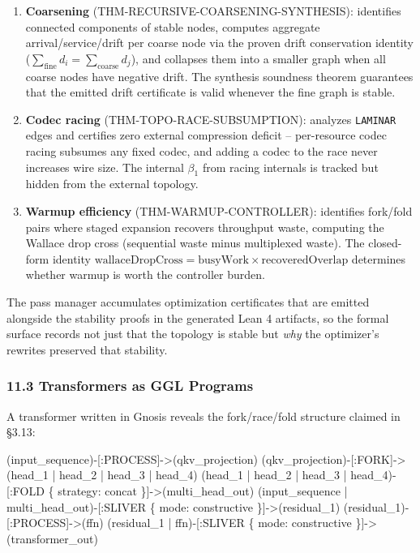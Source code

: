 \documentclass[
  11pt,
]{article}
\newenvironment{Shaded}{}{}
\newcommand{\NormalTok}[1]{#1}
\begin{document}
\begin{enumerate}
\def\labelenumi{\arabic{enumi}.}
\item
  \textbf{Coarsening} (THM-RECURSIVE-COARSENING-SYNTHESIS): identifies
  connected components of stable nodes, computes aggregate
  arrival/service/drift per coarse node via the proven drift
  conservation identity
  (\(\sum_{\text{fine}} d_i = \sum_{\text{coarse}} d_j\)), and collapses
  them into a smaller graph when all coarse nodes have negative drift.
  The synthesis soundness theorem guarantees that the emitted drift
  certificate is valid whenever the fine graph is stable.
\item
  \textbf{Codec racing} (THM-TOPO-RACE-SUBSUMPTION): analyzes
  \texttt{LAMINAR} edges and certifies zero external compression deficit
  -- per-resource codec racing subsumes any fixed codec, and adding a
  codec to the race never increases wire size. The internal \(\beta_1\)
  from racing internals is tracked but hidden from the external
  topology.
\item
  \textbf{Warmup efficiency} (THM-WARMUP-CONTROLLER): identifies
  fork/fold pairs where staged expansion recovers throughput waste,
  computing the Wallace drop cross (sequential waste minus multiplexed
  waste). The closed-form identity
  \(\text{wallaceDropCross} = \text{busyWork} \times \text{recoveredOverlap}\)
  determines whether warmup is worth the controller burden.
\end{enumerate}

The pass manager accumulates optimization certificates that are emitted
alongside the stability proofs in the generated Lean 4 artifacts, so the
formal surface records not just that the topology is stable but
\emph{why} the optimizer's rewrites preserved that stability.

\subsubsection{11.3 Transformers as GGL
Programs}\label{transformers-as-ggl-programs}

A transformer written in Gnosis reveals the fork/race/fold structure
claimed in §3.13:

\begin{Shaded}
\begin{Highlighting}[]
\NormalTok{(input\_sequence){-}[:PROCESS]{-}\textgreater{}(qkv\_projection)}
\NormalTok{(qkv\_projection){-}[:FORK]{-}\textgreater{}(head\_1 | head\_2 | head\_3 | head\_4)}
\NormalTok{(head\_1 | head\_2 | head\_3 | head\_4){-}[:FOLD \{ strategy: \textquotesingle{}concat\textquotesingle{} \}]{-}\textgreater{}(multi\_head\_out)}
\NormalTok{(input\_sequence | multi\_head\_out){-}[:SLIVER \{ mode: \textquotesingle{}constructive\textquotesingle{} \}]{-}\textgreater{}(residual\_1)}
\NormalTok{(residual\_1){-}[:PROCESS]{-}\textgreater{}(ffn)}
\NormalTok{(residual\_1 | ffn){-}[:SLIVER \{ mode: \textquotesingle{}constructive\textquotesingle{} \}]{-}\textgreater{}(transformer\_out)}
\end{Highlighting}
\end{Shaded}
\end{document}
